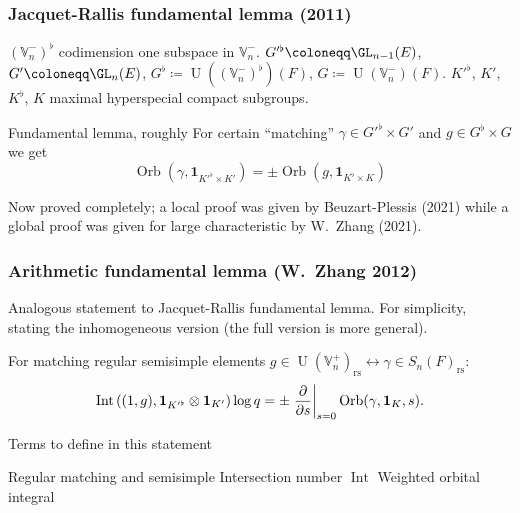 \documentclass[11pt]{beamer}
\DeclareMathOperator{\Int}{Int}
\DeclareMathOperator{\Orb}{Orb}
\DeclareMathOperator{\U}{U}
\newcommand{\VV}{\mathbb{V}}
\newcommand{\rs}{_{\text{rs}}}
\begin{document}
\begin{frame}
  \frametitle{Jacquet-Rallis fundamental lemma (2011)}
  \begin{itemize}
  \ii $(\VV_n^-)^\flat$ codimension one subspace in $\VV_n^-$.
  \ii $G'^\flat \coloneqq \GL_{n-1}(E)$, $G' \coloneqq \GL_n(E)$,
    $G^\flat \coloneqq \U((\VV_n^-)^\flat)(F)$, $G \coloneqq \U(\VV_n^-)(F)$.
  \ii $K'^\flat$, $K'$, $K^\flat$, $K$ maximal hyperspecial compact subgroups.
  \end{itemize}
  \begin{block}{Fundamental lemma, roughly}
    For certain ``matching''
    $\gamma \in G'^\flat \times G'$ and $g \in G^\flat \times G$
    we get
   \[ \Orb(\gamma, \mathbf{1}_{K'^\flat \times K'}) = \pm \Orb(g, \mathbf{1}_{K^\flat \times K}) \]
  \end{block}
  Now proved completely; a local proof was given by Beuzart-Plessis (2021)
  while a global proof was given for large characteristic by W.\ Zhang (2021).
\end{frame}
\begin{frame}
  \frametitle{Arithmetic fundamental lemma (W.\ Zhang 2012)}
  Analogous statement to Jacquet-Rallis fundamental lemma.
  For simplicity, stating the inhomogeneous version (the full version is more general).
  \begin{theorem}
  For matching regular semisimple elements
  $g \in \U(\VV_n^+)\rs \longleftrightarrow \gamma \in S_n(F)\rs$:
  \[
    \Int\left( (1,g), \mathbf{1}_{K'^\flat} \otimes \mathbf{1}_{K'} \right) \log q
    = \pm \left. \pdv{}{s} \right\rvert_{s=0} \Orb(\gamma, \mathbf{1}_K, s).
  \]
  \end{theorem}
  \begin{exampleblock}{Terms to define in this statement}
  \begin{itemize}
    \ii Regular matching and semisimple
    \ii Intersection number $\Int$
    \ii Weighted orbital integral
  \end{itemize}
  \end{exampleblock}
\end{frame}
\end{document}
